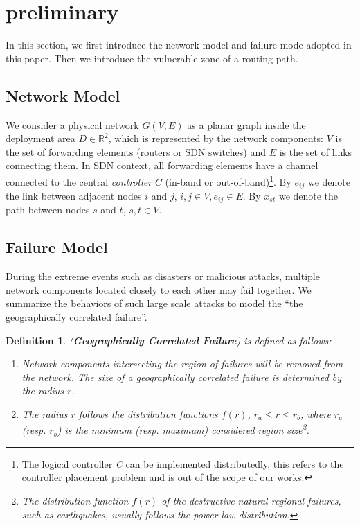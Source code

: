 \documentclass[10pt,journal]{IEEEtran}
\newtheorem{definition}{Definition}
\begin{document}
\section{preliminary}\label{sec:preliminary}
In this section, we first introduce the network model and failure mode adopted in this paper. Then we introduce the vulnerable zone of a routing path. \subsection{Network Model}
We consider a physical network $G(V, E)$ as a planar graph inside the deployment area $D\in \mathbb{R}^{2}$, which is represented by the network components: $V$ is the set of forwarding elements (routers or SDN switches) and $E$ is the set of links connecting them. In SDN context, all forwarding elements have a channel connected to the central \emph{controller} $C$ (in-band or out-of-band)\footnote{The logical controller \emph{C} can be implemented distributedly\cite{heller2012controller,nguyen2013software}, this refers to the controller placement problem and is out of the scope of our works.}.
By $e_{ij}$ we denote the link between adjacent nodes $i$ and $j$, $i,j\in V, e_{ij}\in E$. By $x_{st}$ we denote the path between nodes $s$ and $t$, $s,t\in V$.







\subsection{Failure Model}
During the extreme events such as disasters or malicious attacks, multiple network components located closely to each other may fail together. We summarize the behaviors of such large scale attacks to model the ``the geographically correlated failure''.



\begin{definition} (\textbf{Geographically Correlated Failure}) is defined as follows:
\begin{enumerate}
\item Network components intersecting the region of failures will be removed from the network. The size of a geographically correlated failure is determined by the radius $r$.
\item The radius $r$ follows the distribution functions $f(r)$, $r_{a}\leq r\leq r_{b}$, where $r_{a}$ (resp. $r_{b}$) is the minimum (resp. maximum) considered region size\footnote{The distribution function $f(r)$ of the destructive natural regional failures, such as earthquakes, usually follows the power-law distribution\cite{27627372}.}. \end{enumerate}
\end{definition}
\end{document}
